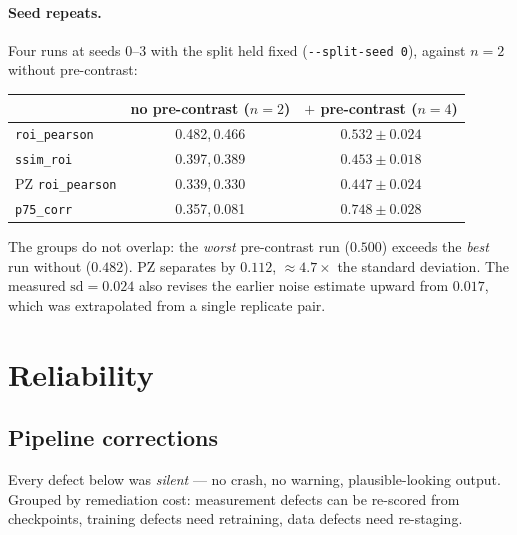 \documentclass[11pt]{article}
\newcommand{\1}{\mathbb{1}}
\begin{document}
\paragraph{Seed repeats.} Four runs at seeds $0$--$3$ with the split held fixed
(\texttt{-{}-split-seed 0}), against $n=2$ without pre-contrast:

\begin{center}
\begin{tabular}{lcc}
\toprule
& no pre-contrast ($n{=}2$) & $+$ pre-contrast ($n{=}4$) \\
\midrule
\texttt{roi\_pearson} & 0.482,\,0.466 & $\mathbf{0.532\pm0.024}$ \\
\texttt{ssim\_roi} & 0.397,\,0.389 & $0.453\pm0.018$ \\
PZ \texttt{roi\_pearson} & 0.339,\,0.330 & $\mathbf{0.447\pm0.024}$ \\
\texttt{p75\_corr} & 0.357,\,0.081 & $0.748\pm0.028$ \\
\bottomrule
\end{tabular}
\end{center}

The groups do not overlap: the \emph{worst} pre-contrast run ($0.500$) exceeds the
\emph{best} run without ($0.482$). PZ separates by $0.112$, $\approx4.7\times$ the standard
deviation. The measured $\mathrm{sd}=0.024$ also revises the earlier noise estimate upward
from $0.017$, which was extrapolated from a single replicate pair.

\section{Reliability}

\subsection{Pipeline corrections}
\label{sec:corrections}

Every defect below was \emph{silent} --- no crash, no warning, plausible-looking output.
Grouped by remediation cost: measurement defects can be re-scored from checkpoints, training
defects need retraining, data defects need re-staging.
\end{document}
